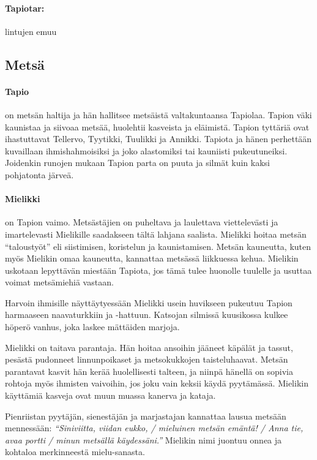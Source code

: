   \paragraph{Tapiotar:} lintujen emuu


\subsection{Metsä}

  \paragraph{Tapio} on metsän haltija ja hän hallitsee metsäistä valtakuntaansa Tapiolaa. Tapion
    väki kaunistaa ja siivoaa metsää, huolehtii kasveista ja eläimistä. Tapion tyttäriä ovat
    ihastuttavat Tellervo, Tyytikki, Tuulikki ja Annikki. Tapiota ja hänen perhettään kuvaillaan
    ihmishahmoisiksi ja joko alastomiksi tai kauniisti pukeutuneiksi. Joidenkin runojen mukaan
    Tapion parta on puuta ja silmät kuin kaksi pohjatonta järveä.
  \paragraph{Mielikki} on Tapion vaimo. Metsästäjien on puheltava ja laulettava viettelevästi ja
    imartelevasti Mielikille saadakseen tältä lahjana saalista. Mielikki hoitaa metsän ``taloustyöt''
    eli siistimisen, koristelun ja kaunistamisen. Metsän kauneutta, kuten myös Mielikin omaa
    kauneutta, kannattaa metsässä liikkuessa kehua. Mielikin uskotaan lepyttävän miestään Tapiota,
    jos tämä tulee huonolle tuulelle ja usuttaa voimat metsämiehiä vastaan.
    \par
    Harvoin ihmisille näyttäytyessään Mielikki usein huvikseen pukeutuu Tapion harmaaseen
    naavaturkkiin ja -hattuun. Katsojan silmissä kuu\-sikossa kulkee höperö vanhus, joka laskee
    mättäiden marjoja.
    \par
    Mielikki on taitava parantaja. Hän hoitaa ansoihin jääneet käpälät ja tassut, pesästä pudonneet
    linnunpoikaset ja metsokukkojen taisteluhaavat. Metsän parantavat kasvit hän kerää
    huolellisesti talteen, ja niinpä hänellä on sopivia rohtoja myös ihmisten vaivoihin, jos joku
    vain keksii käydä pyytämässä. Mielikin käyttämiä kasveja ovat muun muassa kanerva ja kataja.
    \par
    Pienriistan pyytäjän, sienestäjän ja marjastajan kannattaa lausua metsään mennessään:
    \emph{``Siniviitta, viidan eukko, / mieluinen metsän e\-mäntä! / Anna tie, avaa portti / minun
    metsällä käydessäni.''} Mielikin nimi juontuu onnea ja kohtaloa merkinneestä mielu-sanasta.

